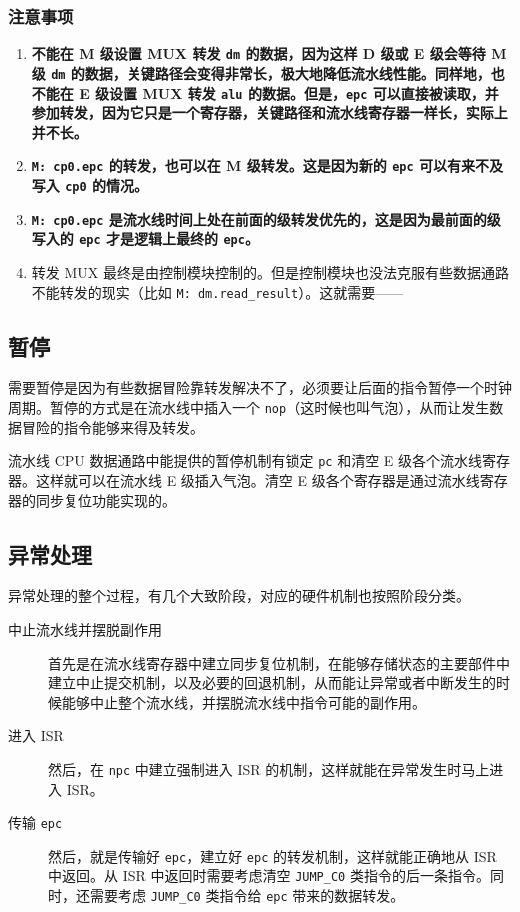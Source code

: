 \documentclass[12pt,AutoFakeBold,AutoFakeSlant]{article}
\providecommand{\tightlist}{%
  \setlength{\itemsep}{0pt}\setlength{\parskip}{0pt}}
\newcommand{\ms}[1]{\texttt{#1}}
\begin{document}
\subsubsection{注意事项}

\begin{enumerate}
\tightlist
\item
\textbf{不能在 M 级设置 MUX 转发 \texttt{dm} 的数据，因为这样 D
级或 E 级会等待 M 级 \texttt{dm}
的数据，关键路径会变得非常长，极大地降低流水线性能。同样地，也不能在 E
级设置 MUX 转发 \texttt{alu} 的数据。但是，\ms{epc} 可以直接被读取，并参加转发，因为它只是一个寄存器，关键路径和流水线寄存器一样长，实际上并不长。}
\item
\textbf{\ms{M: cp0.epc} 的转发，也可以在 M 级转发。这是因为新的 \ms{epc} 可以有来不及写入 \ms{cp0} 的情况。}
\item
\textbf{\texttt{M:\ cp0.epc} 是流水线时间上处在前面的级转发优先的，这是因为最前面的级写入的 \texttt{epc}
才是逻辑上最终的 \texttt{epc}。}
\item
转发 MUX 最终是由控制模块控制的。但是控制模块也没法克服有些数据通路不能转发的现实（比如
\texttt{M:\ dm.read\_result}）。这就需要------
\end{enumerate}

\hypertarget{ux6682ux505c}{%
\subsection{暂停}\label{ux6682ux505c}}

需要暂停是因为有些数据冒险靠转发解决不了，必须要让后面的指令暂停一个时钟周期。暂停的方式是在流水线中插入一个
\ms{nop}（这时候也叫气泡），从而让发生数据冒险的指令能够来得及转发。

流水线 CPU 数据通路中能提供的暂停机制有锁定 \texttt{pc} 和清空 E 级各个流水线寄存器。这样就可以在流水线 E 级插入气泡。清空 E 级各个寄存器是通过流水线寄存器的同步复位功能实现的。

\hypertarget{ux5f02ux5e38ux5904ux7406}{%
\subsection{异常处理}\label{ux5f02ux5e38ux5904ux7406}}

异常处理的整个过程，有几个大致阶段，对应的硬件机制也按照阶段分类。

\begin{description}
\item[中止流水线并摆脱副作用]
首先是在流水线寄存器中建立同步复位机制，在能够存储状态的主要部件中建立中止提交机制，以及必要的回退机制，从而能让异常或者中断发生的时候能够中止整个流水线，并摆脱流水线中指令可能的副作用。
\item[进入 ISR]
然后，在 \ms{npc} 中建立强制进入 ISR 的机制，这样就能在异常发生时马上进入 ISR。
\item[传输 \ms{epc}]
然后，就是传输好 \texttt{epc}，建立好 \texttt{epc} 的转发机制，这样就能正确地从 ISR 中返回。从 ISR 中返回时需要考虑清空 \texttt{JUMP\_C0} 类指令的后一条指令。同时，还需要考虑 \texttt{JUMP\_C0} 类指令给 \ms{epc} 带来的数据转发。
\end{description}
\end{document}
